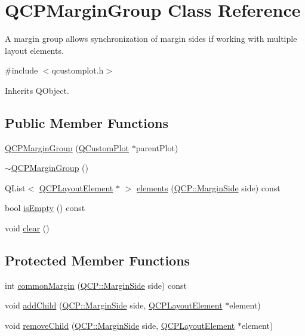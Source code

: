 \hypertarget{class_q_c_p_margin_group}{\section{Q\-C\-P\-Margin\-Group Class Reference}
\label{class_q_c_p_margin_group}
}


A margin group allows synchronization of margin sides if working with multiple layout elements.  




{\ttfamily \#include $<$qcustomplot.\-h$>$}



Inherits Q\-Object.

\subsection*{Public Member Functions}
\begin{DoxyCompactItemize}
\item 
\hyperlink{class_q_c_p_margin_group_ac481c20678ec5b305d6df330715f4b7b}{Q\-C\-P\-Margin\-Group} (\hyperlink{class_q_custom_plot}{Q\-Custom\-Plot} $\ast$parent\-Plot)
\item 
\hyperlink{class_q_c_p_margin_group_a42c62becdaac41406ca90f1c2a755e1c}{$\sim$\-Q\-C\-P\-Margin\-Group} ()
\item 
Q\-List$<$ \hyperlink{class_q_c_p_layout_element}{Q\-C\-P\-Layout\-Element} $\ast$ $>$ \hyperlink{class_q_c_p_margin_group_a2f39e319c9ece34e0392c2ca350f1069}{elements} (\hyperlink{namespace_q_c_p_a7e487e3e2ccb62ab7771065bab7cae54}{Q\-C\-P\-::\-Margin\-Side} side) const 
\item 
bool \hyperlink{class_q_c_p_margin_group_a28c8e87a0b87c01bd28c693faabddd7b}{is\-Empty} () const 
\item 
void \hyperlink{class_q_c_p_margin_group_a144b67f216e4e86c3a3a309e850285fe}{clear} ()
\end{DoxyCompactItemize}
\subsection*{Protected Member Functions}
\begin{DoxyCompactItemize}
\item 
int \hyperlink{class_q_c_p_margin_group_aeaeba9068dba2ef8be41449f0f2582f7}{common\-Margin} (\hyperlink{namespace_q_c_p_a7e487e3e2ccb62ab7771065bab7cae54}{Q\-C\-P\-::\-Margin\-Side} side) const 
\item 
void \hyperlink{class_q_c_p_margin_group_acb9c3a35acec655c2895b7eb95ee0524}{add\-Child} (\hyperlink{namespace_q_c_p_a7e487e3e2ccb62ab7771065bab7cae54}{Q\-C\-P\-::\-Margin\-Side} side, \hyperlink{class_q_c_p_layout_element}{Q\-C\-P\-Layout\-Element} $\ast$element)
\item 
void \hyperlink{class_q_c_p_margin_group_a20ab3286062957d99b58db683fe725b0}{remove\-Child} (\hyperlink{namespace_q_c_p_a7e487e3e2ccb62ab7771065bab7cae54}{Q\-C\-P\-::\-Margin\-Side} side, \hyperlink{class_q_c_p_layout_element}{Q\-C\-P\-Layout\-Element} $\ast$element)
\end{DoxyCompactItemize}
